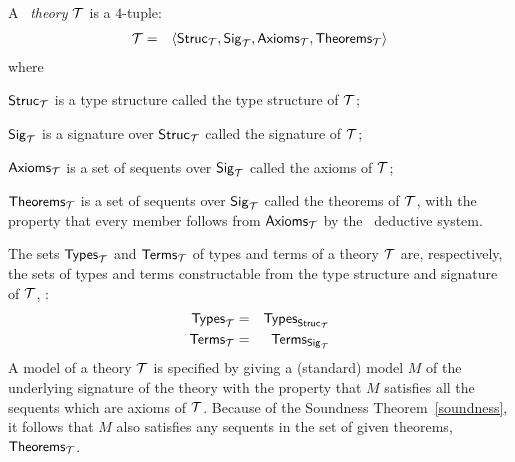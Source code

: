 A \HOL\ {\it theory\/} ${\cal T}$ is a $4$-tuple:
\begin{eqnarray*}
{\cal T} & = & \langle{\sf Struc}_{\cal T},{\sf Sig}_{\cal T},
               {\sf Axioms}_{\cal T},{\sf Theorems}_{\cal T}\rangle
\end{eqnarray*}
where
\begin{myenumerate}

\item ${\sf Struc}_{\cal T}$ is a type structure  called the type
structure of ${\cal T}$;

\item ${\sf Sig}_{\cal T}$ is a signature
over ${\sf Struc}_{\cal T}$ called the signature of ${\cal T}$;

\item ${\sf Axioms}_{\cal T}$ is a set of sequents over ${\sf Sig}_{\cal T}$
called the  axioms
 of  ${\cal T}$;

\item ${\sf Theorems}_{\cal T}$ is a set of sequents over
${\sf Sig}_{\cal T}$ called the theorems of ${\cal T}$, with
the property that every member follows from ${\sf Axioms}_{\cal T}$ by
the \HOL\ deductive system.

\end{myenumerate}

The sets ${\sf Types}_{\cal T}$ and ${\sf Terms}_{\cal T}$ of types and
terms of a theory ${\cal T}$ are, respectively, the sets of types and
terms constructable from the type structure and signature of ${\cal
T}$, \ie:
\begin{eqnarray*}
{\sf Types}_{\cal T} & = & {\sf Types}_{{\sf Struc}_{\cal T}}\\
{\sf Terms}_{\cal T} & = & {\sf Terms}_{{\sf Sig}_{\cal T}}
\end{eqnarray*}
A model of a theory $\cal T$ is specified by giving a (standard) model
$M$ of the underlying signature of the theory with the property that
$M$ satisfies all the sequents which are axioms of $\cal T$.  Because
of the Soundness Theorem~\ref{soundness}, it follows that $M$ also
satisfies any sequents in the set of given  theorems, ${\sf
Theorems}_{\cal T}$.

